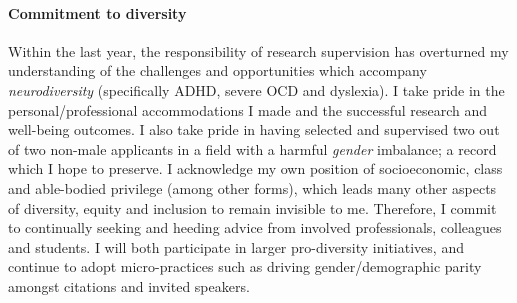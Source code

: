\paragraph{Commitment to diversity} Within the last year, the responsibility of research supervision has overturned my understanding of the challenges and opportunities which accompany \emph{neurodiversity} (specifically ADHD, severe OCD and dyslexia). I take pride in the personal/professional accommodations I made and the successful research and well-being outcomes. I also take pride in having selected and supervised two out of two non-male applicants in a field with a harmful \emph{gender} imbalance; a record which I hope to preserve. I acknowledge my own position of socioeconomic, class and able-bodied privilege (among other forms), which leads many other aspects of diversity, equity and inclusion to remain invisible to me. Therefore, I commit to continually seeking and heeding advice from involved professionals, colleagues and students. I will both participate in larger pro-diversity initiatives, and continue to adopt micro-practices such as driving gender/demographic parity amongst citations and invited speakers.
